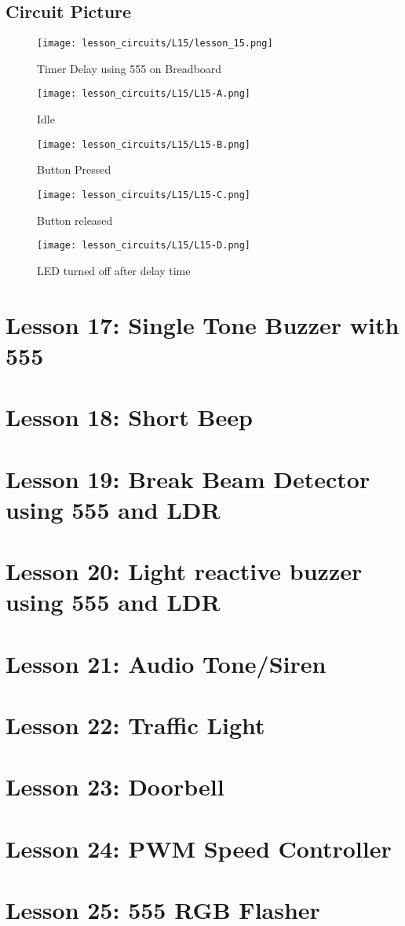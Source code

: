 \subsection{Circuit Picture}
\begin{figure}[htp]
    \centering
    \texttt{[image: lesson\_circuits/L15/lesson\_15.png]}
    \caption{Timer Delay using 555 on Breadboard}
    \label{fig:555_timer_sch}
\end{figure}
\begin{figure}[htp]
    \centering
    \texttt{[image: lesson\_circuits/L15/L15-A.png]}
    \caption{Idle}
    \label{fig:555_timer_obb}
\end{figure}
\begin{figure}[htp]
    \centering
    \texttt{[image: lesson\_circuits/L15/L15-B.png]}
    \caption{Button Pressed}
    \label{fig:555_timer_obb1}
\end{figure}
\begin{figure}[htp]
    \centering
    \texttt{[image: lesson\_circuits/L15/L15-C.png]}
    \caption{Button released}
    \label{fig:555_timer_obb2}
\end{figure}
\begin{figure}[htp]
    \centering
    \texttt{[image: lesson\_circuits/L15/L15-D.png]}
    \caption{LED turned off after delay time}
    \label{fig:555_timer_obb3}
\end{figure}
\section{Lesson 17: Single Tone Buzzer with 555}
\section{Lesson 18: Short Beep}
\section{Lesson 19: Break Beam Detector using 555 and LDR}
\section{Lesson 20: Light reactive buzzer using 555 and LDR}
\section{Lesson 21: Audio Tone/Siren}
\section{Lesson 22: Traffic Light}
\section{Lesson 23: Doorbell}
\section{Lesson 24: PWM Speed Controller}
\section{Lesson 25: 555 RGB Flasher}